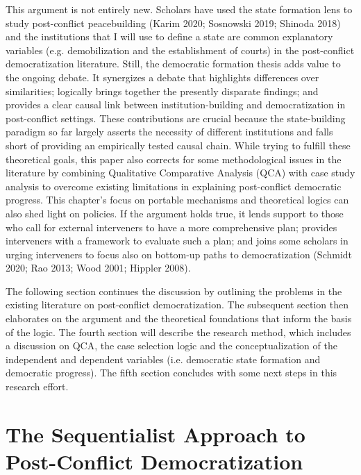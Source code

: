 \documentclass [11pt]{article}
\begin{document}
This argument is not entirely new. Scholars have used the state formation lens to study post-conflict peacebuilding (Karim 2020; Sosnowski 2019; Shinoda 2018) and the institutions that I will use to define a state are common explanatory variables (e.g. demobilization and the establishment of courts) in the post-conflict democratization literature. Still, the democratic formation thesis adds value to the ongoing debate. It synergizes a debate that highlights differences over similarities; logically brings together the presently disparate findings; and provides a clear causal link between institution-building and democratization in post-conflict settings. These contributions are crucial because the state-building paradigm so far largely asserts the necessity of different institutions and falls short of providing an empirically tested causal chain. While trying to fulfill these theoretical goals, this paper also corrects for some methodological issues in the literature by combining Qualitative Comparative Analysis (QCA) with case study analysis to overcome existing limitations in explaining post-conflict democratic progress. This chapter's focus on portable mechanisms and theoretical logics can also shed light on policies. If the argument holds true, it lends support to those who call for external interveners to have a more comprehensive plan; provides interveners with a framework to evaluate such a plan; and joins some scholars in urging interveners to focus also on bottom-up paths to democratization (Schmidt 2020; Rao 2013; Wood 2001; Hippler 2008).

The following section continues the discussion by outlining the problems in the existing literature on post-conflict democratization. The subsequent section then elaborates on the argument and the theoretical foundations that inform the basis of the logic. The fourth section will describe the research method, which includes a discussion on QCA, the case selection logic and the conceptualization of the independent and dependent variables (i.e. democratic state formation and democratic progress). The fifth section concludes with some next steps in this research effort.


\section*{The Sequentialist Approach to Post-Conflict Democratization}
\end{document}
